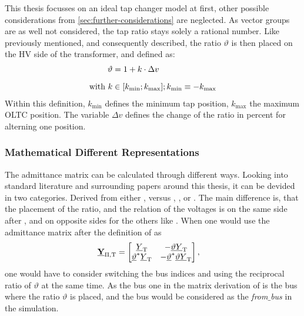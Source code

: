 This thesis focusses on an ideal tap changer model at first, other possible considerations from \autoref{sec:further-considerations} are neglected.
As vector groups are as well not considered, the tap ratio stays solely a rational number.
Like previously mentioned, and consequently described, the ratio $\vartheta$ is then placed on the \acs{HV} side of the transformer, and defined as:
\begin{align}
        \vartheta &= 1 + k \cdot \Delta v \label{eq:tap-ratio-hv} \\[6pt]
        \text{with } k &\in [k_\mathrm{min};k_\mathrm{max}]; k_\mathrm{min} \equiv  -k_\mathrm{max} \notag %
\end{align}
Within this definition, $k_\mathrm{min}$ defines the minimum tap position, $k_\mathrm{max}$ the maximum \acs{OLTC} position. 
The variable $\Delta v$ defines the change of the ratio in percent for alterning one position.

\subsubsection{Mathematical Different Representations}

The admittance matrix can be calculated through different ways.
Looking into standard literature and surrounding papers around this thesis, it can be devided in two categories.
Derived from either \textcite{machowski_2020}, versus \textcite{kundur_2022}, \textcite{milano_2010}, or \textcite{burlakin_2024}.
The main difference is, that the placement of the ratio, and the relation of the voltages is on the same side after \textcite{machowski_2020}, and on opposite sides for the others like \textcite{burlakin_2024}.
When one would use the admittance matrix after the definition of \textcite{machowski_2020} as
\begin{align}
        \underline{\mathrm{\textbf{Y}}}_\mathrm{\Pi,T}&= 
        \begin{bmatrix}
            \underline{Y}_\mathrm{T} & -\underline{\vartheta}\underline{Y}_\mathrm{T} \\
            \underline{\vartheta}^*\underline{Y}_\mathrm{T} & -\underline{\vartheta}^*\underline{\vartheta}\underline{Y}_\mathrm{T}
        \end{bmatrix}, \label{eq:admittance-oltc}
\end{align}
one would have to consider switching the bus indices and using the reciprocal ratio of $\vartheta$ at the same time.
As the bus one in the matrix derivation of \textcite{machowski_2020} is the bus where the ratio $\vartheta$ is placed, and the bus would be considered as the \textit{from$\_$bus} in the simulation.

